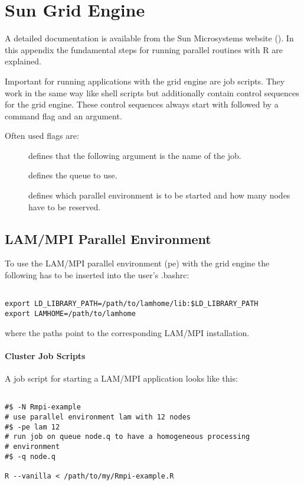 
\chapter{Sun Grid Engine}
\label{app:gridengine}

A detailed documentation is available from the Sun Microsystems
website (\cite{sge07}). In this appendix the fundamental steps for
running parallel routines with R are explained.

Important for running applications with the grid engine are job
scripts. They work in the same way like shell scripts but additionally
contain control sequences for the grid engine. These control sequences
always start with \code{\#\$} 
followed by a command flag and an argument.

Often used flags are:
\begin{description}
\item[] defines that the following argument is the name of
  the job.  
\item[] defines the queue to use.
\item[] defines which parallel environment is to be started
  and how many nodes have to be reserved.
\end{description}

\section{LAM/MPI Parallel Environment}

To use the LAM/MPI parallel environment (pe) with the grid engine the
following has to be inserted into the user's .bashrc:

\begin{verbatim}

export LD_LIBRARY_PATH=/path/to/lamhome/lib:$LD_LIBRARY_PATH
export LAMHOME=/path/to/lamhome

\end{verbatim}

where the paths point to the corresponding LAM/MPI installation.

\subsubsection{Cluster Job Scripts}

A job script for starting a LAM/MPI application looks like this:

\begin{verbatim}

#$ -N Rmpi-example
# use parallel environment lam with 12 nodes
#$ -pe lam 12
# run job on queue node.q to have a homogeneous processing
# environment 
#$ -q node.q

R --vanilla < /path/to/my/Rmpi-example.R
\end{verbatim}

